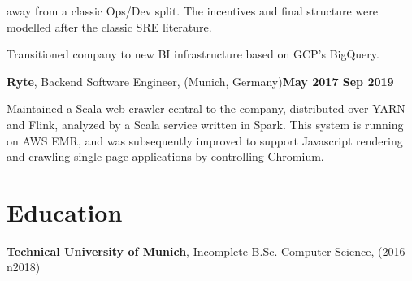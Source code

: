 \documentclass[a4paper]{article}
\renewenvironment{itemize}{
  \begin{list}{}{
      \setlength{\leftmargin}{1em}
      \setlength{\itemsep}{4pt}
  }
}{
\end{list}
}
\begin{document}
\begin{itemize}
\begin{itemize}
      away from a classic Ops/Dev split. The incentives and final structure were
      modelled after the classic SRE literature.
    \item Transitioned company to new BI infrastructure based on GCP's
      BigQuery.
  \end{itemize}
\item {\large \textbf{Ryte}, Backend Software Engineer, {\footnotesize(Munich, Germany)}\hfill \textbf{May 2017 {\textendash} Sep 2019}}
   \begin{itemize}
      \item Maintained a Scala web crawler central to the company,
        distributed over YARN and Flink, analyzed by a Scala service
        written in Spark. This system is running on AWS EMR, and was
        subsequently improved to support Javascript rendering and crawling
        single-page applications by controlling Chromium.
  \end{itemize}
\end{itemize}

\section*{Education}

\begin{itemize}
  \item \textbf{Technical University of Munich}, Incomplete B.Sc. Computer Science,  (2016
    {\textendash} n2018)
\end{itemize}
\end{document}
